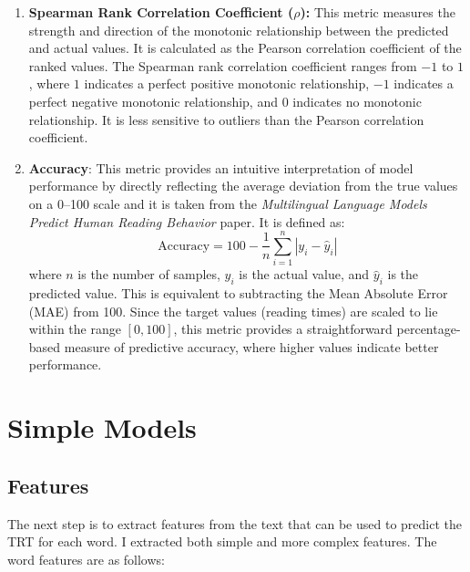 \begin{enumerate}
    \item \textbf{Spearman Rank Correlation Coefficient ($\rho$):} This metric measures the strength and direction of the monotonic relationship between the predicted and actual values. It is calculated as the Pearson correlation coefficient of the ranked values. The Spearman rank correlation coefficient ranges from $-1$ to $1$, where $1$ indicates a perfect positive monotonic relationship, $-1$ indicates a perfect negative monotonic relationship, and $0$ indicates no monotonic relationship. It is less sensitive to outliers than the Pearson correlation coefficient.
    
    \item \textbf{Accuracy}: This metric provides an intuitive interpretation of model performance by directly reflecting the average deviation from the true values on a 0–100 scale and it is taken from the \textit{Multilingual Language Models Predict Human Reading Behavior} \cite{hollenstein-etal-2021-multilingual} paper. It is defined as:
    \begin{equation}
        \text{Accuracy} = 100 - \frac{1}{n} \sum_{i=1}^{n} |y_i - \hat{y}_i|
    \end{equation}
    where \( n \) is the number of samples, \( y_i \) is the actual value, and \( \hat{y}_i \) is the predicted value. This is equivalent to subtracting the Mean Absolute Error (MAE) from 100. Since the target values (reading times) are scaled to lie within the range \([0, 100]\), this metric provides a straightforward percentage-based measure of predictive accuracy, where higher values indicate better performance.
\end{enumerate}


\section{Simple Models}

\subsection{Features}
The next step is to extract features from the text that can be used to predict the TRT for each word. I extracted both simple and more complex features. The word features are as follows:

